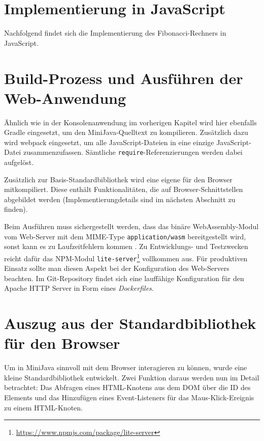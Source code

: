 \section{Implementierung in JavaScript}

Nachfolgend findet sich die Implementierung des Fibonacci-Rechners in JavaScript.


\section{Build-Prozess und Ausführen der Web-Anwendung}

Ähnlich wie in der Konsolenanwendung im vorherigen Kapitel wird hier ebenfalls Gradle eingesetzt, um den MiniJava-Quelltext zu kompilieren. Zusätzlich dazu wird webpack \cite{Webpack} eingesetzt, um alle JavaScript-Dateien in eine einzige JavaScript-Datei zusammenzufassen. Sämtliche \lstinline{require}-Referenzierungen werden dabei aufgelöst.

Zusätzlich zur Basis-Standardbibliothek wird eine eigene für den Browser mitkompiliert. Diese enthält Funktionalitäten, die auf Browser-Schnittstellen abgebildet werden (Implementierungdetails sind im nächsten Abschnitt zu finden).

Beim Ausführen muss sichergestellt werden, dass das binäre WebAssembly-Modul vom Web-Server mit dem MIME-Type \lstinline{application/wasm} bereitgestellt wird, sonst kann es zu Laufzeitfehlern kommen \cite{MDNWebAssembly}. Zu Entwicklungs- und Testzwecken reicht dafür das NPM-Modul \lstinline{lite-server}\footnote{\url{https://www.npmjs.com/package/lite-server}} vollkommen aus. Für produktiven Einsatz sollte man diesen Aspekt bei der Konfiguration des Web-Servers beachten. Im Git-Repository findet sich eine lauffähige Konfiguration für den Apache HTTP Server in Form eines \emph{Dockerfiles}.

\section{Auszug aus der Standardbibliothek für den Browser}

Um in MiniJava sinnvoll mit dem Browser interagieren zu können, wurde eine kleine Standardbibliothek entwickelt. Zwei Funktion daraus werden nun im Detail betrachtet: Das Abfragen eines HTML-Knotens aus dem DOM über die ID des Elements und das Hinzufügen eines Event-Listeners für das Maus-Klick-Ereignis zu einem HTML-Knoten.




